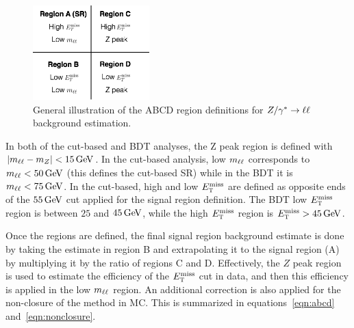 
\begin{figure}[h!]
  \centering
  \captionsetup{justification=centering}
  \includegraphics[width=0.4\textwidth]{figures/ABCD}
  \caption{General illustration of the ABCD region definitions for $Z/\gamma^{\ast}\to\ell\ell$ background estimation.}
  \label{fig:ABCDcuts}
\end{figure}

In both of the cut-based and BDT analyses, the Z peak region is defined with $|\mll - m_Z| < 15 \GeV$. In the cut-based analysis, low $m_{\ell\ell}$ corresponds to $\mll < 50 \GeV$ (this defines the cut-based SR) while in the BDT it is $\mll < 75 \GeV$. In the cut-based, high and low $E_{\textrm{\footnotesize\sc t}}^{\rm miss}$ are defined as opposite ends of the $55 \GeV$ cut applied for the signal region definition. The BDT low $E_{\textrm{\footnotesize\sc t}}^{\rm miss}$ region is between $25$ and $45 \GeV$, while the high $E_{\textrm{\footnotesize\sc t}}^{\rm miss}$ region is $\MET > 45 \GeV$. 

Once the regions are defined, the final signal region background estimate is done by taking the estimate in region B and extrapolating it to the signal region (A) by multiplying it by the ratio of regions C and D. Effectively, the $Z$ peak region is used to estimate the efficiency of the $E_{\textrm{\footnotesize\sc t}}^{\rm miss}$ cut in data, and then this efficiency is applied in the low $m_{\ell\ell}$ region. An additional correction is also applied for the non-closure of the method in MC. This is summarized in equations~\ref{eqn:abcd} and~\ref{eqn:nonclosure}.

